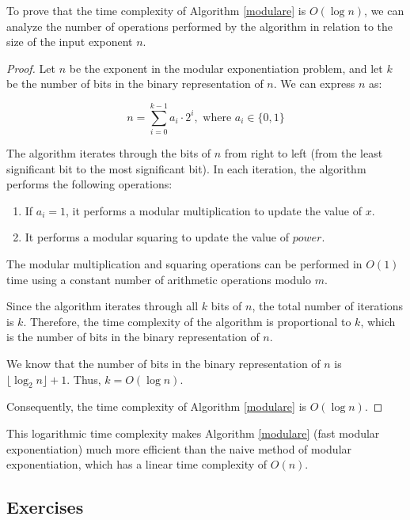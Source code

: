         To prove that the time complexity of Algorithm \ref{modulare} is $O(\log n)$, we can analyze the number of operations performed by the algorithm in relation to the size of the input exponent $n$.

        \begin{proof}
        Let $n$ be the exponent in the modular exponentiation problem, and let $k$ be the number of bits in the binary representation of $n$. We can express $n$ as:

        \[n = \sum_{i=0}^{k-1} a_i \cdot 2^i, \text{ where } a_i \in \{0, 1\}\]

        The algorithm iterates through the bits of $n$ from right to left (from the least significant bit to the most significant bit). In each iteration, the algorithm performs the following operations:

        \begin{enumerate}
        \item If $a_i = 1$, it performs a modular multiplication to update the value of $x$.
        \item It performs a modular squaring to update the value of $\textit{power}$.
        \end{enumerate}

        The modular multiplication and squaring operations can be performed in $O(1)$ time using a constant number of arithmetic operations modulo $m$.

        Since the algorithm iterates through all $k$ bits of $n$, the total number of iterations is $k$. Therefore, the time complexity of the algorithm is proportional to $k$, which is the number of bits in the binary representation of $n$.

        We know that the number of bits in the binary representation of $n$ is $\lfloor \log_2 n \rfloor + 1$. Thus, $k = O(\log n)$.

        Consequently, the time complexity of Algorithm \ref{modulare} is $O(\log n)$.
        \end{proof}

        This logarithmic time complexity makes Algorithm \ref{modulare} (fast modular exponentiation) much more efficient than the naive method of modular exponentiation, which has a linear time complexity of $O(n)$.
    \subsection{Exercises}



